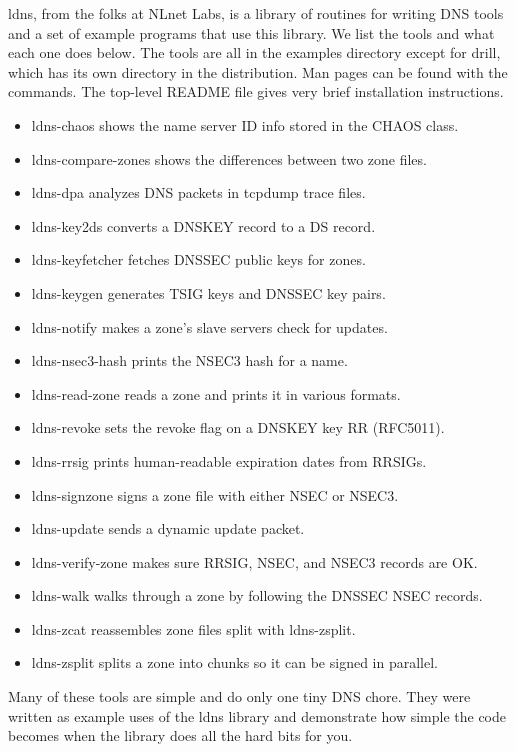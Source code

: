 {ldns}, from the folks at
\protect\hypertarget{part0024_split_067.htmlux5cux23_idIndexMarker2275}{}{}NLnet
Labs, is a library of routines for writing DNS tools and a set of
example programs that use this library. We list the tools and what each
one does below. The tools are all in the {examples} directory except for
{drill}, which has its own directory in the distribution. Man pages can
be found with the commands. The top-level {README} file gives very brief
installation instructions.

\begin{itemize}
\tightlist
\item
  {ldns-chaos} shows the name server ID info stored in the CHAOS class.
\item
  {ldns-compare-zones} shows the differences between two zone files.
\item
  {ldns-dpa} analyzes DNS packets in {tcpdump} trace files.
\item
  {ldns-key2ds} converts a DNSKEY record to a DS record.
\item
  {ldns-keyfetcher} fetches DNSSEC public keys for zones.
\item
  {ldns-keygen} generates TSIG keys and DNSSEC key pairs.
\item
  {ldns-notify} makes a zone's slave servers check for updates.
\item
  {ldns-nsec3-hash} prints the NSEC3 hash for a name.
\item
  {ldns-read-zone} reads a zone and prints it in various formats.
\item
  {ldns-revoke} sets the revoke flag on a DNSKEY key RR (RFC5011).
\item
  {ldns-rrsig} prints human-readable expiration dates from RRSIGs.
\item
  {ldns-signzone} signs a zone file with either NSEC or NSEC3.
\item
  {ldns-update} sends a dynamic update packet.
\item
  {ldns-verify-zone} makes sure RRSIG, NSEC, and NSEC3 records are OK.
\item
  {ldns-walk} walks through a zone by following the DNSSEC NSEC records.
\item
  {ldns-zcat} reassembles zone files split with {ldns-zsplit}.
\item
  {ldns-zsplit} splits a zone into chunks so it can be signed in
  parallel.
\end{itemize}

Many of these tools are simple and do only one tiny DNS chore. They were
written as example uses of the {ldns} library and demonstrate how simple
the code becomes when the library does all the hard bits for you.

